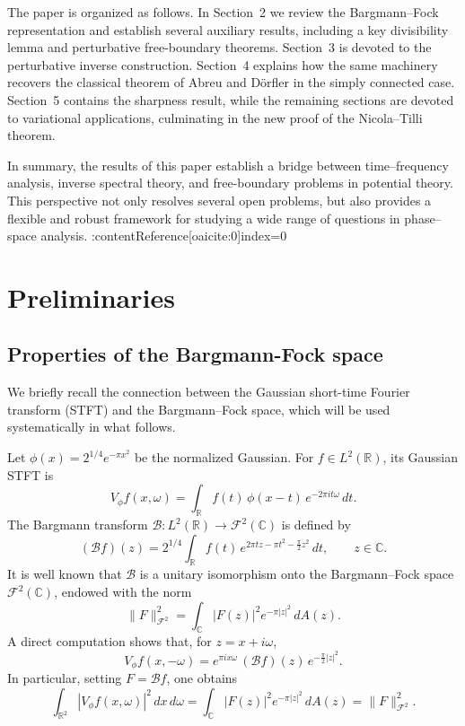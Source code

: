 \documentclass[a4paper,11pt,reqno]{amsart}
\numberwithin{equation}{section}
\theoremstyle{plain} %
\theoremstyle{definition} %
\theoremstyle{remark}
\begin{document}
The paper is organized as follows. In Section~2 we review the Bargmann--Fock representation and establish several auxiliary results, including a key divisibility lemma and perturbative free-boundary theorems. Section~3 is devoted to the perturbative inverse construction. Section~4 explains how the same machinery recovers the classical theorem of Abreu and Dörfler in the simply connected case. Section~5 contains the sharpness result, while the remaining sections are devoted to variational applications, culminating in the new proof of the Nicola--Tilli theorem.

\medskip

In summary, the results of this paper establish a bridge between time--frequency analysis, inverse spectral theory, and free-boundary problems in potential theory. This perspective not only resolves several open problems, but also provides a flexible and robust framework for studying a wide range of questions in phase--space analysis. :contentReference[oaicite:0]{index=0}


\section{Preliminaries}

\subsection{Properties of the Bargmann-Fock space} We briefly recall the connection between the Gaussian short-time Fourier transform
(STFT) and the Bargmann--Fock space, which will be used systematically in what follows.

\medskip

Let $\phi(x) = 2^{1/4} e^{-\pi x^2}$ be the normalized Gaussian. For $f \in L^2(\mathbb{R})$, its Gaussian STFT is
\begin{equation}\label{eq:STFT}
V_\phi f(x,\omega)
= \int_{\mathbb{R}} f(t)\, \phi(x-t)\, e^{-2\pi i t \omega}\, dt.
\end{equation}
The Bargmann transform
$\mathcal{B} : L^2(\mathbb{R}) \to \mathcal{F}^2(\mathbb{C})$ is defined by
\begin{equation}\label{eq:Bargmann}
(\mathcal{B}f)(z)
= 2^{1/4} \int_{\mathbb{R}} f(t)\, e^{2\pi t z - \pi t^2 - \frac{\pi}{2} z^2}\, dt,
\qquad z \in \mathbb{C}.
\end{equation}
It is well known that $\mathcal{B}$ is a unitary isomorphism onto the Bargmann--Fock
space $\mathcal{F}^2(\mathbb{C})$, endowed with the norm
\[
\|F\|_{\mathcal{F}^2}^2
= \int_{\mathbb{C}} |F(z)|^2 e^{-\pi |z|^2} \, dA(z).
\]
A direct computation shows that, for $z = x + i\omega$,
\begin{equation}\label{eq:STFT-B}
V_\phi f(x,-\omega)
= e^{\pi i x \omega}\, (\mathcal{B}f)(z)\, e^{-\frac{\pi}{2}|z|^2}.
\end{equation}
In particular, setting $F = \mathcal{B}f$, one obtains
\begin{equation}\label{eq:energy}
\int_{\mathbb{R}^2} |V_\phi f(x,\omega)|^2 \, dx\, d\omega
= \int_{\mathbb{C}} |F(z)|^2 e^{-\pi |z|^2} \, dA(z)
= \|F\|_{\mathcal{F}^2}^2.
\end{equation}
\end{document}
